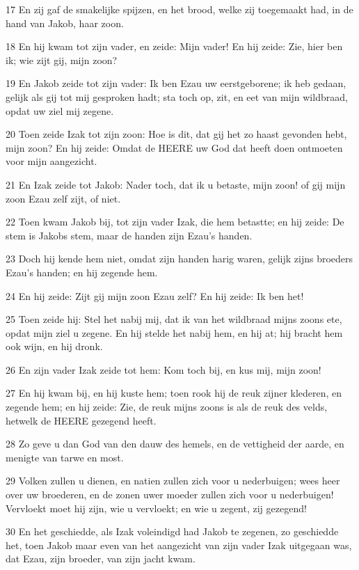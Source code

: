 \par 17 En zij gaf de smakelijke spijzen, en het brood, welke zij toegemaakt had, in de hand van Jakob, haar zoon.
\par 18 En hij kwam tot zijn vader, en zeide: Mijn vader! En hij zeide: Zie, hier ben ik; wie zijt gij, mijn zoon?
\par 19 En Jakob zeide tot zijn vader: Ik ben Ezau uw eerstgeborene; ik heb gedaan, gelijk als gij tot mij gesproken hadt; sta toch op, zit, en eet van mijn wildbraad, opdat uw ziel mij zegene.
\par 20 Toen zeide Izak tot zijn zoon: Hoe is dit, dat gij het zo haast gevonden hebt, mijn zoon? En hij zeide: Omdat de HEERE uw God dat heeft doen ontmoeten voor mijn aangezicht.
\par 21 En Izak zeide tot Jakob: Nader toch, dat ik u betaste, mijn zoon! of gij mijn zoon Ezau zelf zijt, of niet.
\par 22 Toen kwam Jakob bij, tot zijn vader Izak, die hem betastte; en hij zeide: De stem is Jakobs stem, maar de handen zijn Ezau's handen.
\par 23 Doch hij kende hem niet, omdat zijn handen harig waren, gelijk zijns broeders Ezau's handen; en hij zegende hem.
\par 24 En hij zeide: Zijt gij mijn zoon Ezau zelf? En hij zeide: Ik ben het!
\par 25 Toen zeide hij: Stel het nabij mij, dat ik van het wildbraad mijns zoons ete, opdat mijn ziel u zegene. En hij stelde het nabij hem, en hij at; hij bracht hem ook wijn, en hij dronk.
\par 26 En zijn vader Izak zeide tot hem: Kom toch bij, en kus mij, mijn zoon!
\par 27 En hij kwam bij, en hij kuste hem; toen rook hij de reuk zijner klederen, en zegende hem; en hij zeide: Zie, de reuk mijns zoons is als de reuk des velds, hetwelk de HEERE gezegend heeft.
\par 28 Zo geve u dan God van den dauw des hemels, en de vettigheid der aarde, en menigte van tarwe en most.
\par 29 Volken zullen u dienen, en natien zullen zich voor u nederbuigen; wees heer over uw broederen, en de zonen uwer moeder zullen zich voor u nederbuigen! Vervloekt moet hij zijn, wie u vervloekt; en wie u zegent, zij gezegend!
\par 30 En het geschiedde, als Izak voleindigd had Jakob te zegenen, zo geschiedde het, toen Jakob maar even van het aangezicht van zijn vader Izak uitgegaan was, dat Ezau, zijn broeder, van zijn jacht kwam.
